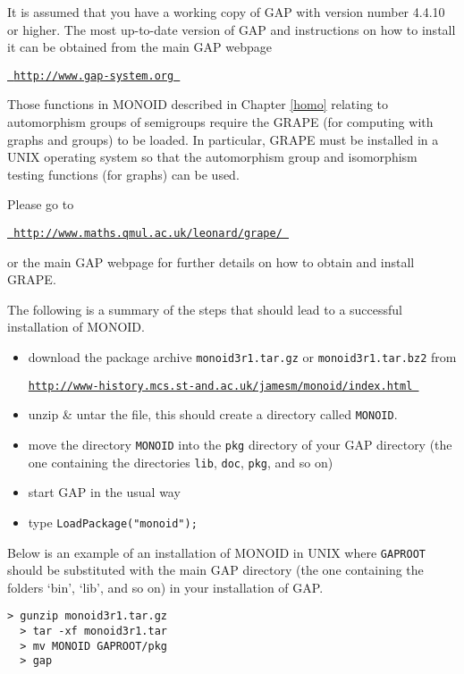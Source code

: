 \documentclass[a4paper,11pt]{report}
\begin{document}
{{ It is assumed that you have a working copy of \textsf{GAP} with version number 4.4.10 or higher. The most up-to-date version of \textsf{GAP} and instructions on how to install it can be obtained from the main \textsf{GAP} webpage

 \href{ http://www.gap-system.org } {\texttt{ http://www.gap-system.org }}

 Those functions in \textsf{MONOID} described in Chapter \ref{homo} relating to automorphism groups of semigroups require the \textsf{GRAPE} (for computing with graphs and groups) to be loaded. In particular, \textsf{GRAPE} must be installed in a UNIX operating system so that the automorphism group
and isomorphism testing functions (for graphs) can be used.

 Please go to 

 \href{ http://www.maths.qmul.ac.uk/~leonard/grape/ } {\texttt{ http://www.maths.qmul.ac.uk/\texttt{}leonard/grape/ }}

 or the main \textsf{GAP} webpage for further details on how to obtain and install \textsf{GRAPE}. 

 The following is a summary of the steps that should lead to a successful
installation of \textsf{MONOID}. 
\begin{itemize}
\item  download the package archive \texttt{monoid3r1.tar.gz} or \texttt{monoid3r1.tar.bz2} from 

 \href{http://www-history.mcs.st-and.ac.uk/~jamesm/monoid/index.html } {\texttt{http://www-history.mcs.st-and.ac.uk/\texttt{}jamesm/monoid/index.html }}

 
\item  unzip \& untar the file, this should create a directory called \texttt{MONOID}.
\item  move the directory \texttt{MONOID} into the \texttt{pkg} directory of your \textsf{GAP} directory (the one containing the directories \texttt{lib}, \texttt{doc}, \texttt{pkg}, and so on)
\item  start \textsf{GAP} in the usual way
\item  type \texttt{LoadPackage("monoid");}
\end{itemize}
 Below is an example of an installation of \textsf{MONOID} in UNIX where \texttt{GAPROOT} should be substituted with the main \textsf{GAP} directory (the one containing the folders `bin', `lib', and so on) in your
installation of \textsf{GAP}.

 
\begin{Verbatim}[fontsize=\small,frame=single,label=Example]
  > gunzip monoid3r1.tar.gz 
  > tar -xf monoid3r1.tar 
  > mv MONOID GAPROOT/pkg
  > gap 
  

\end{Verbatim}}}
\end{document}
